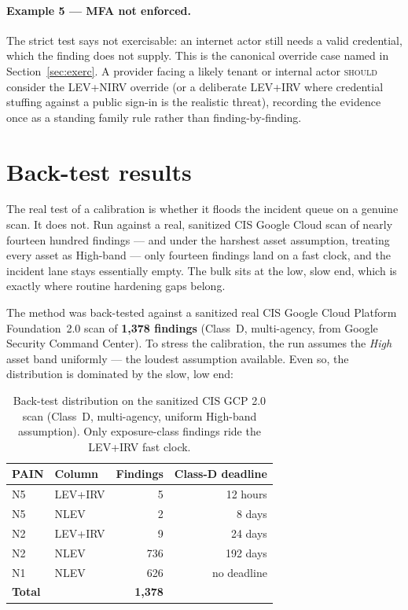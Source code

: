 \documentclass[11pt]{article}
\newcommand{\rfckw}[1]{\textsc{#1}}
\begin{document}
\paragraph{Example 5 --- MFA not enforced.} The strict test says not exercisable: an
internet actor still needs a valid credential, which the finding does not supply. This
is the canonical override case named in Section~\ref{sec:exerc}. A provider facing a
likely tenant or internal actor \rfckw{should} consider the LEV+NIRV override (or a
deliberate LEV+IRV where credential stuffing against a public sign-in is the realistic
threat), recording the evidence once as a standing family rule rather than
finding-by-finding.

\section{Back-test results}
\label{sec:backtest}
\begin{plain}
The real test of a calibration is whether it floods the incident queue on a genuine
scan. It does not. Run against a real, sanitized CIS Google Cloud scan of nearly
fourteen hundred findings --- and under the harshest asset assumption, treating every
asset as High-band --- only fourteen findings land on a fast clock, and the incident
lane stays essentially empty. The bulk sits at the low, slow end, which is exactly
where routine hardening gaps belong.
\end{plain}

The method was back-tested against a sanitized real CIS Google Cloud Platform
Foundation~2.0 scan of \textbf{1{,}378 findings} (Class~D, multi-agency, from Google
Security Command Center). To stress the calibration, the run assumes the
\emph{High} asset band uniformly --- the loudest assumption available. Even so, the
distribution is dominated by the slow, low end:

\begin{table}[H]
\centering
\renewcommand{\arraystretch}{1.25}
\footnotesize
\begin{tabular}{l l r r}
\toprule
\textbf{PAIN} & \textbf{Column} & \textbf{Findings} & \textbf{Class-D deadline} \\
\midrule
N5 & LEV+IRV & 5   & 12 hours \\
N5 & NLEV    & 2   & 8 days \\
N2 & LEV+IRV & 9   & 24 days \\
N2 & NLEV    & 736 & 192 days \\
N1 & NLEV    & 626 & no deadline \\
\midrule
\multicolumn{2}{l}{\textbf{Total}} & \textbf{1{,}378} & \\
\bottomrule
\end{tabular}
\caption{Back-test distribution on the sanitized CIS GCP 2.0 scan (Class~D,
multi-agency, uniform High-band assumption). Only exposure-class findings ride the
LEV+IRV fast clock.}
\label{tab:backtest}
\end{table}
\end{document}
